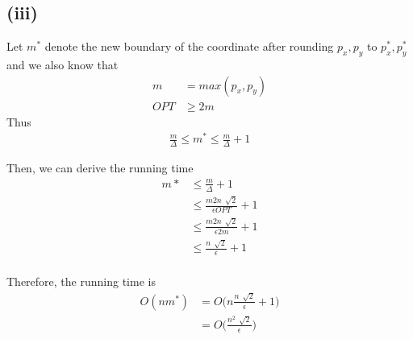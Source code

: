 \subsection*{(iii)}

Let $m^*$ denote the new boundary of the coordinate after rounding $p_{x}, p_{y}$ to $p^*_{x}, p^*_{y}$
and we also know that
\begin{align*}
			m &= max(p_x,p_y ) \\
			OPT &\geq 2m
\end{align*}
Thus
\begin{align*}
			\frac{m}{\Delta} \leq m^* \leq \frac{m}{\Delta} + 1
\end{align*}

Then, we can derive the running time
\begin{align*}
	m* &\leq \frac{m}{\Delta} + 1 \\
	&\leq \frac{m2n\,\sqrt[]{2}}{\epsilon OPT}+1 \\
	&\leq \frac{m2n\,\sqrt[]{2}}{\epsilon 2m}+1 \\
	&\leq \frac{n\,\sqrt[]{2}}{\epsilon}+1 \\
\end{align*}

Therefore, the running time is
\begin{align*}
	O\left(nm^*\right) &= O\Big(n\frac{n\,\sqrt[]{2}}{\epsilon}+1 \Big) \\
	&= O\Big(\frac{n^2\,\sqrt[]{2}}{\epsilon} \Big)
\end{align*}
